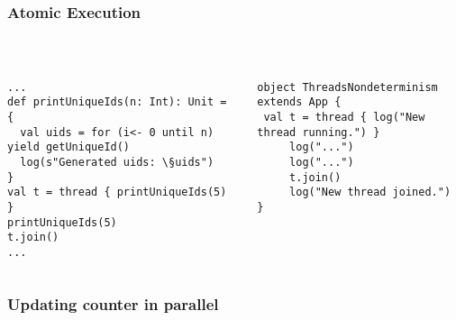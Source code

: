 \documentclass[aspectratio=169]{beamer}
\begin{document}
\begin{frame}[fragile]\frametitle{Atomic Execution}
~\\[-8mm]
\begin{columns}
\begin{column}{0.49\textwidth}
\begin{lstlisting}[emph={printUniqueIds,sleep,log,thread,join}]
...
def printUniqueIds(n: Int): Unit = {
  val uids = for (i<- 0 until n) yield getUniqueId()
  log(s"Generated uids: \§uids")
}
val t = thread { printUniqueIds(5) }
printUniqueIds(5)
t.join()
...
\end{lstlisting}
\end{column}
\begin{column}{0.49\textwidth}
\begin{lstlisting}[emph={sleep,log,thread,join}]
object ThreadsNondeterminism extends App {
 val t = thread { log("New thread running.") }
     log("...")
     log("...")
     t.join()
     log("New thread joined.")
}
\end{lstlisting}
\end{column}
\end{columns}
%
\end{frame}

\begin{frame}\frametitle{Updating counter in parallel}
  \centering

  \medskip
  
\end{frame}
\end{document}
